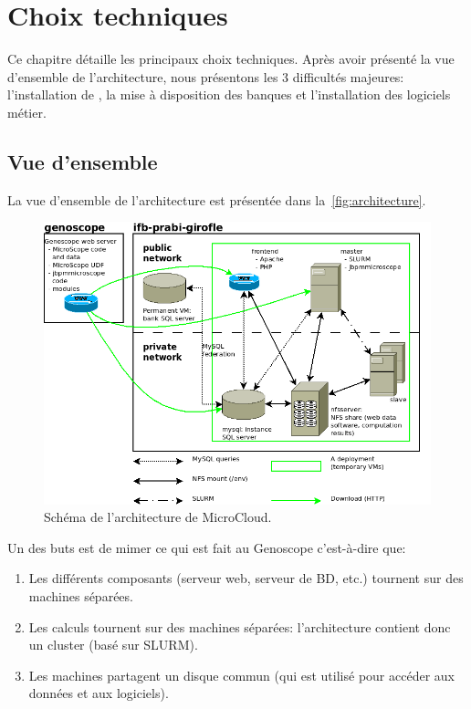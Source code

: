 \chapter{Choix techniques} \label{chap:choix_techniques}

Ce chapitre détaille les principaux choix techniques.
Après avoir présenté la vue d'ensemble de l'architecture, nous présentons les 3 difficultés majeures:
l'installation de , la mise à disposition des banques et
l'installation des logiciels métier.

\section{Vue d'ensemble}

La vue d'ensemble de l'architecture est présentée dans la~\autoref{fig:architecture}.

\begin{figure}[htp]
    \centering
    \includegraphics[width=\linewidth]{../Architecture}
    \caption{Schéma de l'architecture de MicroCloud.}
    \label{fig:architecture}
\end{figure}

Un des buts est de mimer ce qui est fait au Genoscope
c'est-à-dire que:
\begin{enumerate}
    \item Les différents composants (serveur web, serveur de BD, etc.) tournent sur des machines séparées.
    \item Les calculs tournent sur des machines séparées: l'architecture contient donc un cluster (basé sur SLURM).
    \item Les machines partagent un disque commun (qui est utilisé pour accéder aux données et aux logiciels).
\end{enumerate}\vspace*{\baselineskip}

